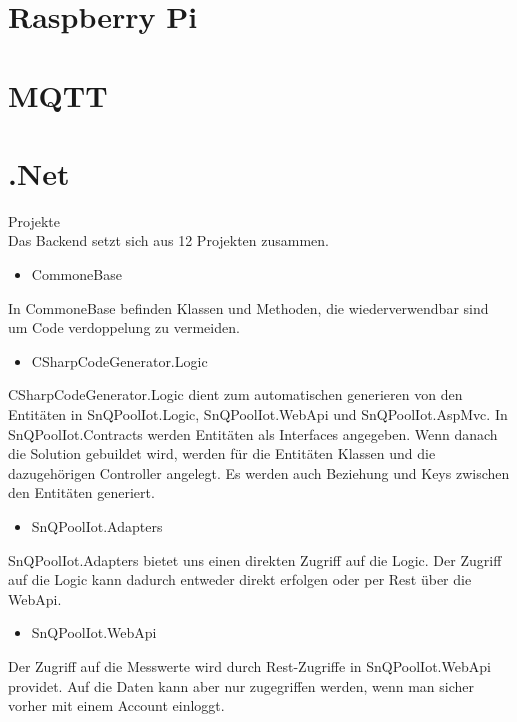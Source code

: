 \section{Raspberry Pi}



\section{MQTT}


\section{.Net}

Projekte\\
Das Backend setzt sich aus 12 Projekten zusammen.

\begin{itemize}
    \item CommoneBase
\end{itemize}

In CommoneBase befinden Klassen und Methoden, die wiederverwendbar sind um Code verdoppelung zu vermeiden.

\begin{itemize}
    \item CSharpCodeGenerator.Logic
\end{itemize}

CSharpCodeGenerator.Logic dient zum automatischen generieren von den Entitäten 
in SnQPoolIot.Logic, SnQPoolIot.WebApi und SnQPoolIot.AspMvc.
In SnQPoolIot.Contracts werden Entitäten als Interfaces angegeben.
Wenn danach die Solution gebuildet wird, werden für die Entitäten Klassen und die dazugehörigen Controller angelegt.
Es werden auch Beziehung und Keys zwischen den Entitäten generiert.


\begin{itemize}
    \item SnQPoolIot.Adapters
\end{itemize}

SnQPoolIot.Adapters bietet uns einen direkten Zugriff auf die Logic.
Der Zugriff auf die Logic kann dadurch entweder direkt erfolgen oder per Rest über die WebApi.

\begin{itemize}
    \item SnQPoolIot.WebApi
\end{itemize}

Der Zugriff auf die Messwerte wird durch Rest-Zugriffe in SnQPoolIot.WebApi providet.
Auf die Daten kann aber nur zugegriffen werden, wenn man sicher vorher mit einem Account einloggt.  

